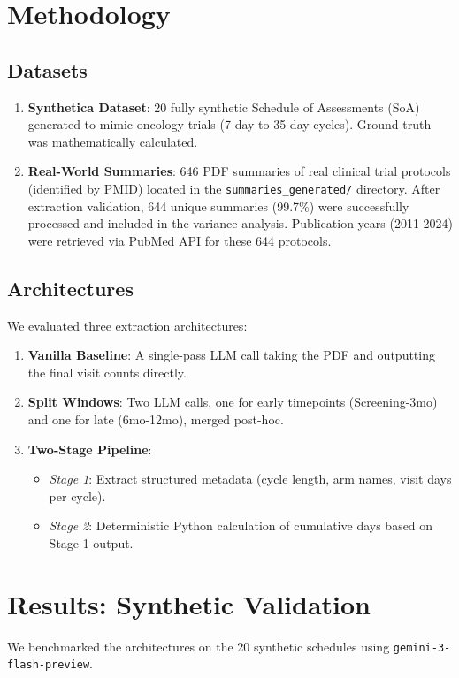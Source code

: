 \documentclass[11pt, a4paper]{article}
\begin{document}
\section{Methodology}
\subsection{Datasets}
\begin{enumerate}
    \item \textbf{Synthetica Dataset}: 20 fully synthetic Schedule of Assessments (SoA) generated to mimic oncology trials (7-day to 35-day cycles). Ground truth was mathematically calculated.
    \item \textbf{Real-World Summaries}: 646 PDF summaries of real clinical trial protocols (identified by PMID) located in the \texttt{summaries\_generated/} directory. After extraction validation, 644 unique summaries (99.7\%) were successfully processed and included in the variance analysis. Publication years (2011-2024) were retrieved via PubMed API for these 644 protocols.
\end{enumerate}

\subsection{Architectures}
We evaluated three extraction architectures:
\begin{enumerate}
    \item \textbf{Vanilla Baseline}: A single-pass LLM call taking the PDF and outputting the final visit counts directly.
    \item \textbf{Split Windows}: Two LLM calls, one for early timepoints (Screening-3mo) and one for late (6mo-12mo), merged post-hoc.
    \item \textbf{Two-Stage Pipeline}: 
    \begin{itemize}
        \item \textit{Stage 1}: Extract structured metadata (cycle length, arm names, visit days per cycle).
        \item \textit{Stage 2}: Deterministic Python calculation of cumulative days based on Stage 1 output.
    \end{itemize}
\end{enumerate}

\section{Results: Synthetic Validation}
We benchmarked the architectures on the 20 synthetic schedules using \texttt{gemini-3-flash-preview}.
\end{document}

